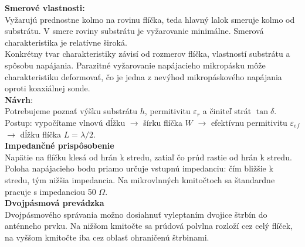 \textbf{Smerové vlastnosti:}\\
Vyžarujú prednostne kolmo na rovinu flíčka, teda hlavný lalok smeruje kolmo od substrátu. V smere roviny substrátu je vyžarovanie minimálne. Smerová charakteristika je relatívne široká.\\ 
\medskip
Konkrétny tvar charakteristiky závisí od rozmerov flíčka, vlastností substrátu a spôsobu napájania. Parazitné vyžarovanie napájacieho mikropásku môže charakteristiku deformovať, čo je jedna z nevýhod mikropáskového napájania oproti koaxiálnej sonde.\\
\bigskip
\textbf{Návrh}:\\
Potrebujeme poznať výšku substrátu $h$, permitivitu $\varepsilon_r$ a činiteľ strát $\tan \delta$. Postup: vypočítame vlnovú dĺžku $\rightarrow$ šírku flíčka $W$ $\rightarrow$ efektívnu permitivitu $\varepsilon_{ef}$ $\rightarrow$ dĺžku flíčka $L = \lambda/2$.\\
\medskip
\textbf{Impedančné prispôsobenie}\\
Napätie na flíčku klesá od hrán k stredu, zatiaľ čo prúd rastie od hrán k stredu. Poloha napájacieho bodu priamo určuje vstupnú impedanciu: čím bližšie k stredu, tým nižšia impedancia. Na mikrovlnných kmitočtoch sa štandardne pracuje s impedanciou 50 $\Omega$.\\
\medskip
\textbf{Dvojpásmová prevádzka}\\
Dvojpásmového správania možno dosiahnuť vyleptaním dvojice štrbín do anténneho prvku. Na nižšom kmitočte sa prúdová polvlna rozloží cez celý flíček, na vyššom kmitočte iba cez oblasť ohraničenú štrbinami.



%



 